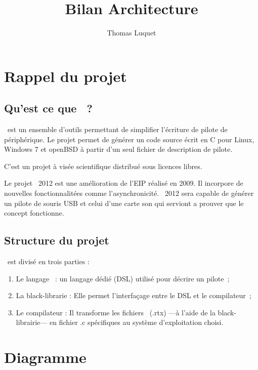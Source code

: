 \documentclass{rtxreport}
\author{Thomas Luquet}
\title{Bilan Architecture}
\begin{document}
\maketitle

\rtxmaketitleblock

\tableofcontents

\chapter{Rappel du projet}

\section{Qu'est ce que \rtx\ ?}

\rtx\ est un ensemble d'outils permettant de simplifier l'écriture de pilote de
périphérique. Le projet permet de générer un code source écrit en C pour Linux,
Windows 7 et openBSD à partir d'un seul fichier de description de pilote.

C'est un projet à visée scientifique distribué sous licences libres.

Le projet \rtx\ 2012 est une amélioration de l'EIP réalisé en 2009. Il
incorpore de nouvelles fonctionnalitées comme l’asynchronicité. \rtx\ 2012 sera
capable de générer un pilote de souris USB et celui d'une carte son qui serviont a prouver que le concept fonctionne.


\section{Structure du projet}

\rtx\ est divisé en trois parties :

\begin{enumerate}
\item Le langage \rtx\ : un langage dédié (DSL) utilisé pour décrire un pilote~;
\item La black-librarie : Elle permet l'interfaçage entre le DSL et le
compilateur~;
\item Le compilateur : Il transforme les fichiers \rtx\ (.rtx) ---à l'aide
de la black-librairie--- en fichier .c spécifiques au système d'exploitation choisi.
\end{enumerate}

\chapter{Diagramme}
\end{document}
